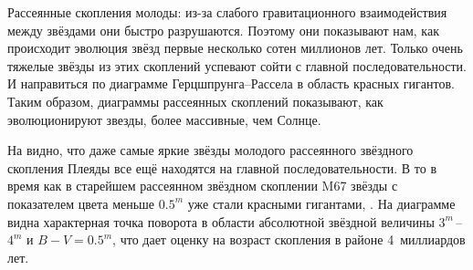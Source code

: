 Рассеянные скопления молоды: из-за слабого гравитационного взаимодействия между звёздами они быстро разрушаются. Поэтому они показывают нам, как происходит эволюция звёзд первые несколько сотен миллионов лет. Только очень тяжелые звёзды из этих скоплений успевают сойти с главной последовательности. И направиться по диаграмме Герцшпрунга--Рассела в область красных гигантов. Таким образом, диаграммы рассеянных скоплений показывают, как эволюционируют звезды, более массивные, чем Солнце.

На  видно, что даже самые яркие звёзды молодого рассеянного звёздного скопления Плеяды все ещё находятся на главной последовательности. В то в время как в старейшем рассеянном звёздном скоплении M67 звёзды с показателем цвета меньше $0.5^m$ уже стали красными гигантами, . На диаграмме видна характерная точка поворота в области абсолютной звёздной величины $3^m$\,--\,$4^m$ и $B-V=0.5^m$, что дает оценку на возраст скопления в районе 4~миллиардов лет.
